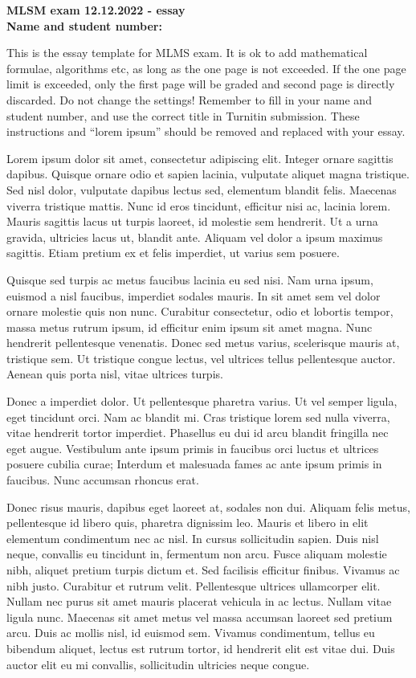 \documentclass[12pt,a4paper]{article}
\begin{document}
\textbf{MLSM exam 12.12.2022 - essay \\ Name and student number:  }



This is the essay template for MLMS exam. It is ok to add mathematical formulae, algorithms etc, as long as the one page is not exceeded. If the one page limit is exceeded, only the first page will be graded and second page is directly discarded. Do not change the settings! Remember to fill in your name and student number, and use the correct title in Turnitin submission. These instructions and “lorem ipsum” should be removed and replaced with your essay. 


Lorem ipsum dolor sit amet, consectetur adipiscing elit. Integer ornare sagittis dapibus. Quisque ornare odio et sapien lacinia, vulputate aliquet magna tristique. Sed nisl dolor, vulputate dapibus lectus sed, elementum blandit felis. Maecenas viverra tristique mattis. Nunc id eros tincidunt, efficitur nisi ac, lacinia lorem. Mauris sagittis lacus ut turpis laoreet, id molestie sem hendrerit. Ut a urna gravida, ultricies lacus ut, blandit ante. Aliquam vel dolor a ipsum maximus sagittis. Etiam pretium ex et felis imperdiet, ut varius sem posuere.

Quisque sed turpis ac metus faucibus lacinia eu sed nisi. Nam urna ipsum, euismod a nisl faucibus, imperdiet sodales mauris. In sit amet sem vel dolor ornare molestie quis non nunc. Curabitur consectetur, odio et lobortis tempor, massa metus rutrum ipsum, id efficitur enim ipsum sit amet magna. Nunc hendrerit pellentesque venenatis. Donec sed metus varius, scelerisque mauris at, tristique sem. Ut tristique congue lectus, vel ultrices tellus pellentesque auctor. Aenean quis porta nisl, vitae ultrices turpis.

Donec a imperdiet dolor. Ut pellentesque pharetra varius. Ut vel semper ligula, eget tincidunt orci. Nam ac blandit mi. Cras tristique lorem sed nulla viverra, vitae hendrerit tortor imperdiet. Phasellus eu dui id arcu blandit fringilla nec eget augue. Vestibulum ante ipsum primis in faucibus orci luctus et ultrices posuere cubilia curae; Interdum et malesuada fames ac ante ipsum primis in faucibus. Nunc accumsan rhoncus erat.

Donec risus mauris, dapibus eget laoreet at, sodales non dui. Aliquam felis metus, pellentesque id libero quis, pharetra dignissim leo. Mauris et libero in elit elementum condimentum nec ac nisl. In cursus sollicitudin sapien. Duis nisl neque, convallis eu tincidunt in, fermentum non arcu. Fusce aliquam molestie nibh, aliquet pretium turpis dictum et. Sed facilisis efficitur finibus. Vivamus ac nibh justo. Curabitur et rutrum velit. Pellentesque ultrices ullamcorper elit. Nullam nec purus sit amet mauris placerat vehicula in ac lectus. Nullam vitae ligula nunc. Maecenas sit amet metus vel massa accumsan laoreet sed pretium arcu. Duis ac mollis nisl, id euismod sem. Vivamus condimentum, tellus eu bibendum aliquet, lectus est rutrum tortor, id hendrerit elit est vitae dui. Duis auctor elit eu mi convallis, sollicitudin ultricies neque congue.
\end{document}
